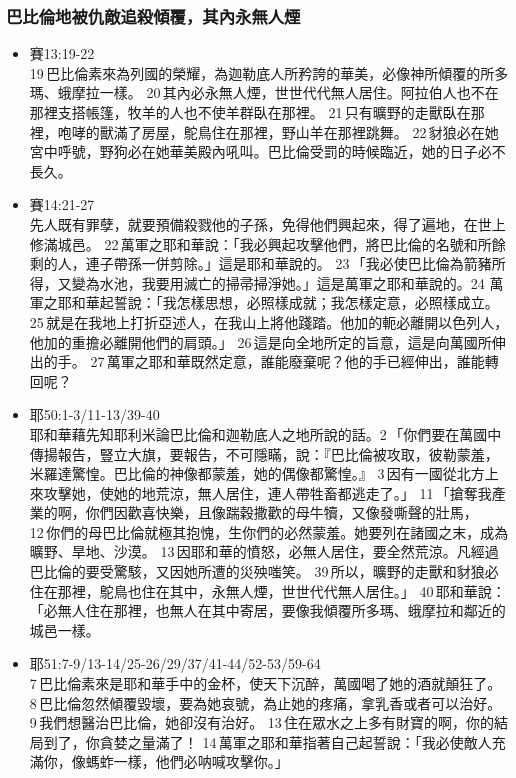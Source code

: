 \subsubsection{巴比倫地被仇敵追殺傾覆，其內永無人煙}
\begin{itemize}
\item 賽13:19-22\\
19 巴比倫素來為列國的榮耀，為迦勒底人所矜誇的華美，必像神所傾覆的所多瑪、蛾摩拉一樣。 20 其內必永無人煙，世世代代無人居住。阿拉伯人也不在那裡支搭帳篷，牧羊的人也不使羊群臥在那裡。 21 只有曠野的走獸臥在那裡，咆哮的獸滿了房屋，鴕鳥住在那裡，野山羊在那裡跳舞。 22 豺狼必在她宮中呼號，野狗必在她華美殿內吼叫。巴比倫受罰的時候臨近，她的日子必不長久。
\item 賽14:21-27\\
先人既有罪孽，就要預備殺戮他的子孫，免得他們興起來，得了遍地，在世上修滿城邑。 
22 萬軍之耶和華說：「我必興起攻擊他們，將巴比倫的名號和所餘剩的人，連子帶孫一併剪除。」這是耶和華說的。 
23 「我必使巴比倫為箭豬所得，又變為水池，我要用滅亡的掃帚掃淨她。」這是萬軍之耶和華說的。24 萬軍之耶和華起誓說：「我怎樣思想，必照樣成就；我怎樣定意，必照樣成立。 25 就是在我地上打折亞述人，在我山上將他踐踏。他加的軛必離開以色列人，他加的重擔必離開他們的肩頭。」 26 這是向全地所定的旨意，這是向萬國所伸出的手。 27 萬軍之耶和華既然定意，誰能廢棄呢？他的手已經伸出，誰能轉回呢？
\item 耶50:1-3/11-13/39-40\\
耶和華藉先知耶利米論巴比倫和迦勒底人之地所說的話。2 「你們要在萬國中傳揚報告，豎立大旗，要報告，不可隱瞞，說：『巴比倫被攻取，彼勒蒙羞，米羅達驚惶。巴比倫的神像都蒙羞，她的偶像都驚惶。』 3 因有一國從北方上來攻擊她，使她的地荒涼，無人居住，連人帶牲畜都逃走了。」
11 「搶奪我產業的啊，你們因歡喜快樂，且像踹穀撒歡的母牛犢，又像發嘶聲的壯馬， 12 你們的母巴比倫就極其抱愧，生你們的必然蒙羞。她要列在諸國之末，成為曠野、旱地、沙漠。 13 因耶和華的憤怒，必無人居住，要全然荒涼。凡經過巴比倫的要受驚駭，又因她所遭的災殃嗤笑。 
39 所以，曠野的走獸和豺狼必住在那裡，鴕鳥也住在其中，永無人煙，世世代代無人居住。」 40 耶和華說：「必無人住在那裡，也無人在其中寄居，要像我傾覆所多瑪、蛾摩拉和鄰近的城邑一樣。
\item 耶51:7-9/13-14/25-26/29/37/41-44/52-53/59-64\\
 7 巴比倫素來是耶和華手中的金杯，使天下沉醉，萬國喝了她的酒就顛狂了。 8 巴比倫忽然傾覆毀壞，要為她哀號，為止她的疼痛，拿乳香或者可以治好。 9 我們想醫治巴比倫，她卻沒有治好。
13 住在眾水之上多有財寶的啊，你的結局到了，你貪婪之量滿了！ 14 萬軍之耶和華指著自己起誓說：「我必使敵人充滿你，像螞蚱一樣，他們必呐喊攻擊你。」

\end{itemize}
